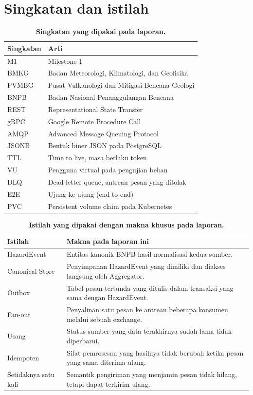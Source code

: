 \documentclass{fairmeta}
\begin{document}
\section{Singkatan dan istilah}
\label{sec:glossary}

\begin{table}[htbp]
\centering
\caption{\textbf{Singkatan yang dipakai pada laporan.}}
\label{tab:abbreviations}
\footnotesize
\begin{tabularx}{\textwidth}{@{}L{2.6cm}Y@{}}
\toprule
\textbf{Singkatan} & \textbf{Arti}\\
\midrule
M1 & Milestone 1\\
BMKG & Badan Meteorologi, Klimatologi, dan Geofisika\\
PVMBG & Pusat Vulkanologi dan Mitigasi Bencana Geologi\\
BNPB & Badan Nasional Penanggulangan Bencana\\
REST & Representational State Transfer\\
gRPC & Google Remote Procedure Call\\
AMQP & Advanced Message Queuing Protocol\\
JSONB & Bentuk biner JSON pada PostgreSQL\\
TTL & Time to live, masa berlaku token\\
VU & Pengguna virtual pada pengujian beban\\
DLQ & Dead-letter queue, antrean pesan yang ditolak\\
E2E & Ujung ke ujung (end to end)\\
PVC & Persistent volume claim pada Kubernetes\\
\bottomrule
\end{tabularx}
\end{table}

\begin{table}[htbp]
\centering
\caption{\textbf{Istilah yang dipakai dengan makna khusus pada laporan.}}
\label{tab:terms}
\footnotesize
\begin{tabularx}{\textwidth}{@{}L{2.6cm}Y@{}}
\toprule
\textbf{Istilah} & \textbf{Makna pada laporan ini}\\
\midrule
HazardEvent & Entitas kanonik BNPB hasil normalisasi kedua sumber.\\
Canonical Store & Penyimpanan HazardEvent yang dimiliki dan diakses langsung oleh Aggregator.\\
Outbox & Tabel pesan tertunda yang ditulis dalam transaksi yang sama dengan HazardEvent.\\
Fan-out & Penyalinan satu pesan ke antrean beberapa konsumen melalui sebuah exchange.\\
Usang & Status sumber yang data terakhirnya sudah lama tidak diperbarui.\\
Idempoten & Sifat pemrosesan yang hasilnya tidak berubah ketika pesan yang sama diterima ulang.\\
Setidaknya satu kali & Semantik pengiriman yang menjamin pesan tidak hilang, tetapi dapat terkirim ulang.\\
\bottomrule
\end{tabularx}
\end{table}
\end{document}
